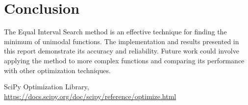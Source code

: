 \documentclass[11pt]{article}
\begin{document}
\section{Conclusion}
The Equal Interval Search method is an effective technique for finding the minimum of unimodal functions. The implementation and results presented in this report demonstrate its accuracy and reliability. Future work could involve applying the method to more complex functions and comparing its performance with other optimization techniques.

\begin{thebibliography}{9}
SciPy Optimization Library, \url{https://docs.scipy.org/doc/scipy/reference/optimize.html}
\end{thebibliography}
\end{document}
